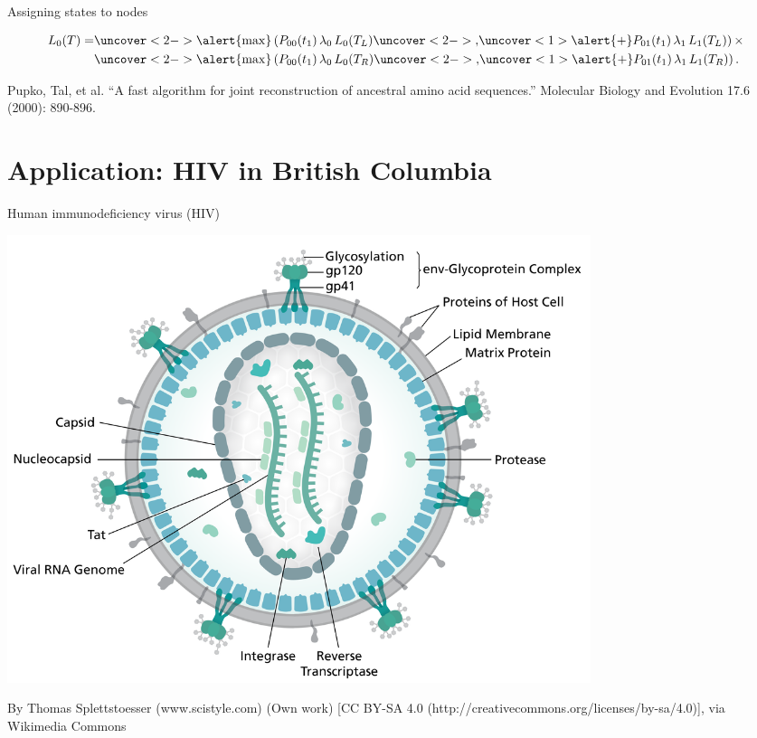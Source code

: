 \documentclass{beamer}
\begin{document}

\begin{frame}{Assigning states to nodes}
    \begin{center}
    \end{center}

    \begin{align*}
        L_0(T) = &\uncover<2->{\alert{\max}}\left(P_{00}(t_1)\,\lambda_0\,L_0(T_L) 
        \uncover<2->{,}\uncover<1>{\alert{+}}
        P_{01}(t_1)\,\lambda_1\,L_1(T_L)\right) \times \\
        &\uncover<2->{\alert{\max}}\left(P_{00}(t_1)\,\lambda_0\,L_0(T_R)
        \uncover<2->{,}\uncover<1>{\alert{+}} P_{01}(t_1)\,\lambda_1\,L_1(T_R)\right).
    \end{align*}

    \tiny
    Pupko, Tal, et al. ``A fast algorithm for joint reconstruction of ancestral
    amino acid sequences.'' Molecular Biology and Evolution 17.6 (2000):
    890-896.\par
\end{frame}

\section{Application: HIV in British Columbia}

\begin{frame}{Human immunodeficiency virus (HIV)}
    \vspace{-0.5cm}
    \begin{center}
    \includegraphics[width=0.75\textwidth]{hiv-structure}
    \end{center}
    \tiny
    By Thomas Splettstoesser (www.scistyle.com) (Own work) [CC BY-SA 4.0
    (http://creativecommons.org/licenses/by-sa/4.0)], via Wikimedia Commons \par
\end{frame}
\end{document}
